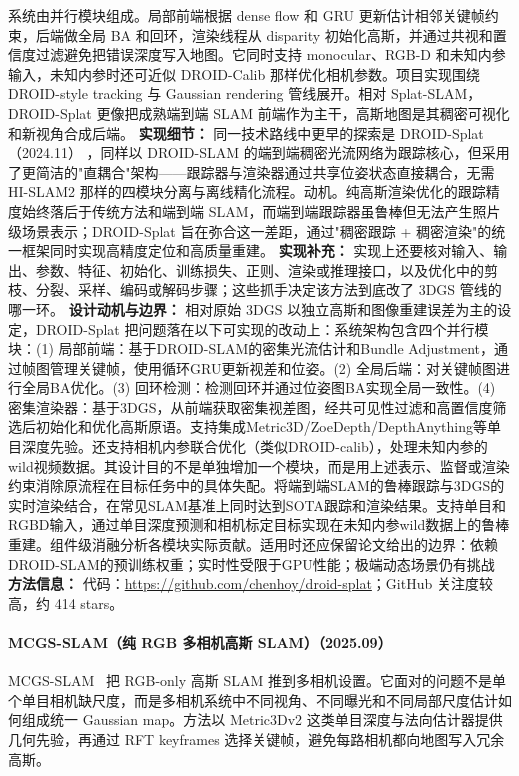 系统由并行模块组成。局部前端根据 dense flow 和 GRU 更新估计相邻关键帧约束，后端做全局 BA 和回环，渲染线程从 disparity 初始化高斯，并通过共视和置信度过滤避免把错误深度写入地图。它同时支持 monocular、RGB-D 和未知内参输入，未知内参时还可近似 DROID-Calib 那样优化相机参数。项目实现围绕 DROID-style tracking 与 Gaussian rendering 管线展开。相对 Splat-SLAM，DROID-Splat 更像把成熟端到端 SLAM 前端作为主干，高斯地图是其稠密可视化和新视角合成后端。
\textbf{实现细节：} 同一技术路线中更早的探索是 DROID-Splat（2024.11） ，同样以 DROID-SLAM 的端到端稠密光流网络为跟踪核心，但采用了更简洁的"直耦合"架构——跟踪器与渲染器通过共享位姿状态直接耦合，无需 HI-SLAM2 那样的四模块分离与离线精化流程。动机。纯高斯渲染优化的跟踪精度始终落后于传统方法和端到端 SLAM，而端到端跟踪器虽鲁棒但无法产生照片级场景表示；DROID-Splat 旨在弥合这一差距，通过"稠密跟踪 + 稠密渲染"的统一框架同时实现高精度定位和高质量重建。
\textbf{实现补充：} 实现上还要核对输入、输出、参数、特征、初始化、训练损失、正则、渲染或推理接口，以及优化中的剪枝、分裂、采样、编码或解码步骤；这些抓手决定该方法到底改了 3DGS 管线的哪一环。
\textbf{设计动机与边界：} 相对原始 3DGS 以独立高斯和图像重建误差为主的设定，DROID-Splat 把问题落在以下可实现的改动上：系统架构包含四个并行模块：(1) 局部前端：基于DROID-SLAM的密集光流估计和Bundle Adjustment，通过帧图管理关键帧，使用循环GRU更新视差和位姿。(2) 全局后端：对关键帧图进行全局BA优化。(3) 回环检测：检测回环并通过位姿图BA实现全局一致性。(4) 密集渲染器：基于3DGS，从前端获取密集视差图，经共可见性过滤和高置信度筛选后初始化和优化高斯原语。支持集成Metric3D/ZoeDepth/DepthAnything等单目深度先验。还支持相机内参联合优化（类似DROID-calib），处理未知内参的wild视频数据。其设计目的不是单独增加一个模块，而是用上述表示、监督或渲染约束消除原流程在目标任务中的具体失配。将端到端SLAM的鲁棒跟踪与3DGS的实时渲染结合，在常见SLAM基准上同时达到SOTA跟踪和渲染结果。支持单目和RGBD输入，通过单目深度预测和相机标定目标实现在未知内参wild数据上的鲁棒重建。组件级消融分析各模块实际贡献。适用时还应保留论文给出的边界：依赖DROID-SLAM的预训练权重；实时性受限于GPU性能；极端动态场景仍有挑战
\textbf{方法信息：} 代码：\url{https://github.com/chenhoy/droid-splat}；GitHub 关注度较高，约 414 stars。



\paragraph{MCGS-SLAM（纯 RGB 多相机高斯 SLAM）（2025.09）}
MCGS-SLAM~\cite{2509_14191} 把 RGB-only 高斯 SLAM 推到多相机设置。它面对的问题不是单个单目相机缺尺度，而是多相机系统中不同视角、不同曝光和不同局部尺度估计如何组成统一 Gaussian map。方法以 Metric3Dv2 这类单目深度与法向估计器提供几何先验，再通过 RFT keyframes 选择关键帧，避免每路相机都向地图写入冗余高斯。

